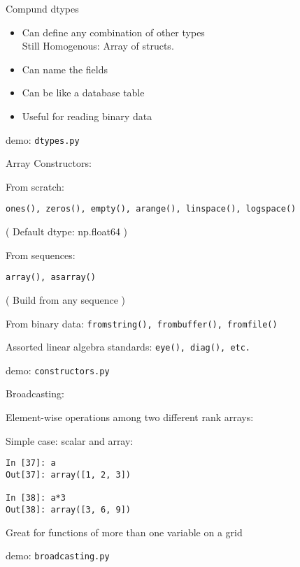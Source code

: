 \documentclass{beamer}
\begin{document}
\begin{frame}[fragile]{Compund dtypes}

{\Large
\begin{itemize}
  \item Can define any combination of other types \\
        Still Homogenous:  Array of structs.
  \item Can name the fields
  \item Can be like a database table
  \item Useful for reading binary data
\end{itemize}
}

\vfill
{\Large demo: \verb|dtypes.py|}

\end{frame} 

\begin{frame}[fragile]{Array Constructors:}

{\Large From scratch:}

\verb|ones(), zeros(), empty(), arange(), linspace(), logspace()|

( Default dtype: np.float64 )


\vfill
{\Large From sequences:}

\verb|array(), asarray()|

( Build from any sequence )

\vfill
{\Large  From binary data:}
\verb|fromstring(), frombuffer(), fromfile()|

\vfill
{\Large Assorted linear algebra standards:}
\verb|eye(), diag(), etc.| 

\vfill
{\large demo: \verb|constructors.py|}
\end{frame} 

\begin{frame}[fragile]{Broadcasting:}

{\Large Element-wise operations among two different rank arrays:}

\vfill
{\Large Simple case: scalar and array:}

\begin{verbatim}
In [37]: a
Out[37]: array([1, 2, 3])

In [38]: a*3
Out[38]: array([3, 6, 9])
\end{verbatim}

{\Large Great for functions of more than one variable on a grid}

\vfill
{\large demo: \verb|broadcasting.py|}
\end{frame} 
\end{document}
